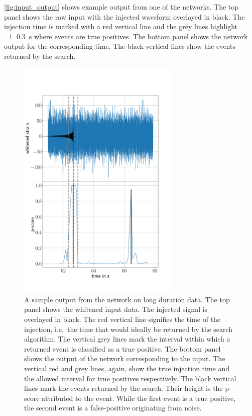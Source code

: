 \autoref{fig:input_output} shows example output from one of the networks. The top panel shows the raw input with the injected waveform overlayed in black. The injection time is marked with a red vertical line and the grey lines highlight \SI[parse-numbers=false]{\pm 0.3}{\second} where events are true positives. The bottom panel shows the network output for the corresponding time. The black vertical lines show the events returned by the search.

\begin{figure}
    \centering
    \includegraphics[width=0.7\textwidth]{chapters/training_strats/images/fixed_low_709.pdf}
    \caption[Sample output]{A sample output from the network on long duration data. The top panel shows the whitened input data. The injected signal is overlayed in black. The red vertical line signifies the time of the injection, i.e.\ the time that would ideally be returned by the search algorithm. The vertical grey lines mark the interval within which a returned event is classified as a true positive. The bottom panel shows the output of the network corresponding to the input. The vertical red and grey lines, again, show the true injection time and the allowed interval for true positives respectively. The black vertical lines mark the events returned by the search. Their height is the p-score attributed to the event. While the first event is a true positive, the second event is a false-positive originating from noise.}
    \label{fig:input_output}
\end{figure}

